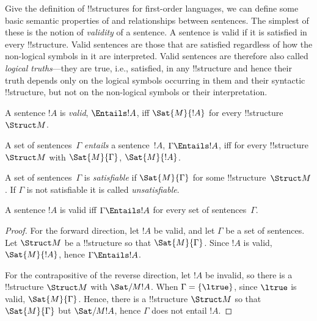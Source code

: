 \documentclass[../../include/open-logic-section]{subfiles}
\begin{document}

\begin{explain}
Give the definition of !!{structure}s for first-order languages, we can
define some basic semantic properties of and relationships between
sentences.  The simplest of these is the notion of \emph{validity} of
a sentence.  A sentence is valid if it is satisfied in every
!!{structure}.  Valid sentences are those that are satisfied regardless of
how the non-logical symbols in it are interpreted.  Valid sentences
are therefore also called \emph{logical truths}---they are true, i.e.,
satisfied, in any !!{structure} and hence their truth depends only on the
logical symbols occurring in them and their syntactic !!{structure}, but not
on the non-logical symbols or their interpretation.  
\end{explain}

\begin{defn}[Validity]
A sentence $!A$ is \emph{valid}, $\Entails !A$, iff $\Sat{M}{!A}$ for every
!!{structure}~$\Struct M$.
\end{defn}

\begin{defn}[Entailment]
A set of sentences~$\Gamma$ \emph{entails} a sentence~$!A$, $\Gamma
\Entails !A$, iff for every !!{structure}~$\Struct M$ with
$\Sat{M}{\Gamma}$, $\Sat{M}{!A}$.
\end{defn}


\begin{defn}[Satisfiability]
A set of sentences~$\Gamma$ is \emph{satisfiable} if $\Sat{M}{\Gamma}$
for some !!{structure}~$\Struct M$.  If $\Gamma$ is not satisfiable it is
called \emph{unsatisfiable}.
\end{defn}

\begin{prop}
A sentence $!A$ is valid iff $\Gamma \Entails !A$ for every set of
sentences~$\Gamma$.
\end{prop}

\begin{proof}
For the forward direction, let $!A$ be valid, and let $\Gamma$ be a
set of sentences. Let $\Struct M$ be a !!{structure} so that
$\Sat{M}{\Gamma}$. Since $!A$ is valid, $\Sat{M}{!A}$, hence $\Gamma
\Entails !A$.

For the contrapositive of the reverse direction, let $!A$ be invalid,
so there is a !!{structure} $\Struct M$ with $\Sat/{M}{!A}$. When $\Gamma
= \{ \ltrue \}$, since $\ltrue$ is valid, $\Sat{M}{\Gamma}$. Hence,
there is a !!{structure} $\Struct M$ so that $\Sat{M}{\Gamma}$ but
$\Sat/{M}{!A}$, hence $\Gamma$ does not entail $!A$.
\end{proof}
\end{document}
